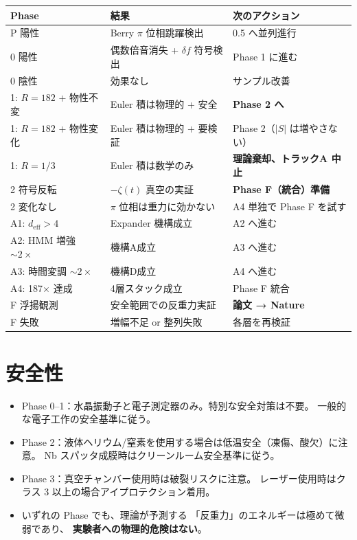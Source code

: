 \documentclass[11pt,a4paper]{article}
\begin{document}
\begin{center}
\begin{tabular}{lp{5cm}l}
\toprule
Phase & 結果 & 次のアクション \\
\midrule
P 陽性 & Berry $\pi$ 位相跳躍検出 & 0.5 へ並列進行 \\
0 陽性 & 偶数倍音消失 + $\delta f$ 符号検出 & Phase 1 に進む \\
0 陰性 & 効果なし & サンプル改善 \\
\midrule
1: $R = 182$ + 物性不変 & Euler 積は物理的 + 安全 & \textbf{Phase 2 へ} \\
1: $R = 182$ + 物性変化 & Euler 積は物理的 + 要検証 & Phase 2（$|S|$ は増やさない） \\
1: $R = 1/3$ & Euler 積は数学のみ & \textbf{理論棄却、トラックA 中止} \\
\midrule
2 符号反転 & $-\zeta(t)$ 真空の実証 & \textbf{Phase F（統合）準備} \\
2 変化なし & $\pi$ 位相は重力に効かない & A4 単独で Phase F を試す \\
\midrule
A1: $d_{\mathrm{eff}} > 4$ & Expander 機構成立 & A2 へ進む \\
A2: HMM 増強 $\sim 2\times$ & 機構A成立 & A3 へ進む \\
A3: 時間変調 $\sim 2\times$ & 機構D成立 & A4 へ進む \\
A4: 187$\times$ 達成 & 4層スタック成立 & Phase F 統合 \\
\midrule
F 浮揚観測 & 安全範囲での反重力実証 & \textbf{論文 → Nature} \\
F 失敗 & 増幅不足 or 整列失敗 & 各層を再検証 \\
\bottomrule
\end{tabular}
\end{center}


\section{安全性}

\begin{tcolorbox}[colback=gray!10,colframe=gray!50!black,title=安全上の注意]
\begin{itemize}
\item Phase 0--1：水晶振動子と電子測定器のみ。特別な安全対策は不要。
  一般的な電子工作の安全基準に従う。
\item Phase 2：液体ヘリウム/窒素を使用する場合は低温安全（凍傷、酸欠）に注意。
  Nb スパッタ成膜時はクリーンルーム安全基準に従う。
\item Phase 3：真空チャンバー使用時は破裂リスクに注意。
  レーザー使用時はクラス 3 以上の場合アイプロテクション着用。
\item いずれの Phase でも、理論が予測する
  「反重力」のエネルギーは極めて微弱であり、
  \textbf{実験者への物理的危険はない}。
\end{itemize}
\end{tcolorbox}
\end{document}
